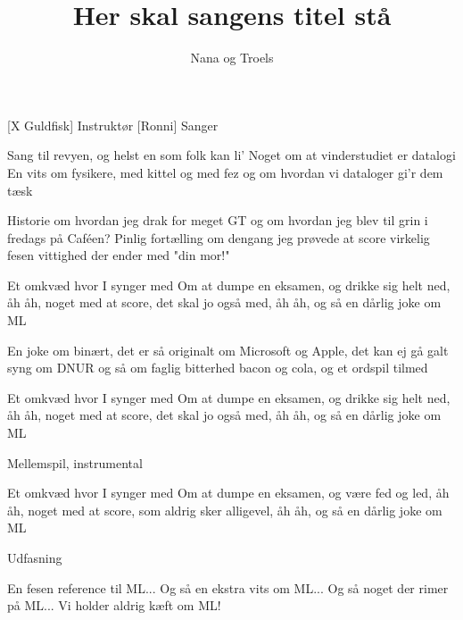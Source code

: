 \documentclass[a4paper,11pt]{article}
\title{Her skal sangens titel stå}
\author{Nana og Troels}
\begin{document}
\maketitle

\begin{roles}
[X Guldfisk] Instruktør
[Ronni] Sanger
\end{roles}

\begin{song}

Sang til revyen, og helst en som folk kan li'
Noget om at vinderstudiet er datalogi
En vits om fysikere, med kittel og med fez
og om hvordan vi dataloger gi'r dem tæsk

Historie om hvordan jeg drak for meget GT
og om hvordan jeg blev til grin i fredags på Caféen?
Pinlig fortælling om dengang jeg prøvede at score
virkelig fesen vittighed der ender med "din mor!"

Et omkvæd hvor I synger med
Om at dumpe en eksamen,
og drikke sig helt ned,
åh åh, noget med at score,
det skal jo også med,
åh åh, og så en dårlig joke om ML

En joke om binært, det er så originalt
om Microsoft og Apple, det kan ej gå galt
syng om DNUR og så om faglig bitterhed
bacon og cola, og et ordspil tilmed

Et omkvæd hvor I synger med
Om at dumpe en eksamen,
og drikke sig helt ned,
åh åh, noget med at score,
det skal jo også med,
åh åh, og så en dårlig joke om ML

\scene Mellemspil, instrumental

Et omkvæd hvor I synger med
Om at dumpe en eksamen,
og være fed og led,
åh åh, noget med at score,
som aldrig sker alligevel,
åh åh, og så en dårlig joke om ML

\scene Udfasning

En fesen reference til ML...
Og så en ekstra vits om ML...
Og så noget der rimer på ML...
Vi holder aldrig kæft om ML!
\end{song}
\end{document}
